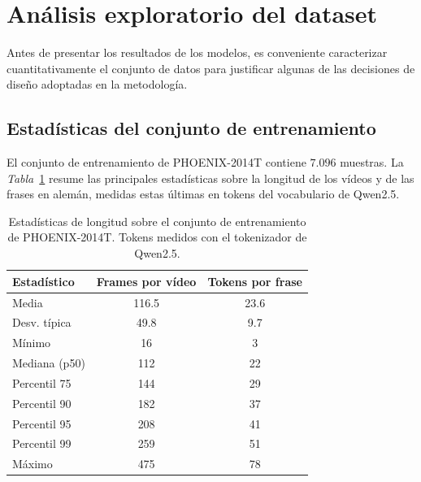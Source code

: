 
\section{Análisis exploratorio del dataset}
Antes de presentar los resultados de los modelos, es conveniente caracterizar cuantitativamente el conjunto de datos para justificar algunas de las decisiones de diseño adoptadas en la metodología.

\subsection{Estadísticas del conjunto de entrenamiento}
El conjunto de entrenamiento de PHOENIX-2014T contiene $7.096$ muestras.
La \textit{Tabla}~\ref{tab:dataset_stats} resume las principales estadísticas sobre la longitud de los vídeos y de las frases en alemán, medidas estas últimas en tokens del vocabulario de Qwen2.5.

\begin{table}[H]
	\centering
	\begin{tabular}{lcc}
		\hline
		\textbf{Estadístico} & \textbf{Frames por vídeo} & \textbf{Tokens por frase} \\ \hline
		Media                & 116.5                       & 23.6                      \\
		Desv. típica         & 49.8                       & 9.7                       \\
		Mínimo               & 16                       & 3                         \\
		Mediana (p50)        & 112                       & 22                        \\
		Percentil 75         & 144                       & 29                        \\
		Percentil 90         & 182                       & 37                        \\
		Percentil 95         & 208                       & 41                        \\
		Percentil 99         & 259                       & 51                        \\
		Máximo               & 475                       & 78                        \\ \hline
		\end{tabular}
		\caption{Estadísticas de longitud sobre el conjunto de entrenamiento de PHOENIX-2014T\@. Tokens medidos con el tokenizador de Qwen2.5.}
	\label{tab:dataset_stats}
\end{table}

